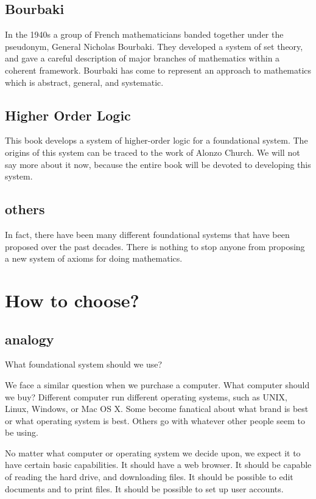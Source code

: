 \documentclass[cup9a]{cupbook}
\begin{document}
\subsection{Bourbaki}

In the 1940s a group of French mathematicians banded together under the pseudonym, General Nicholas Bourbaki.  They developed a system of set theory, and gave a careful description of major branches of mathematics within a coherent framework.  Bourbaki has come to represent an approach to mathematics which is abstract, general, and systematic.

\subsection{Higher Order Logic}

This book develops a system of higher-order logic for a foundational system.  The origins of this system can be traced to the work of Alonzo Church.  We will not say more about it now, because the entire book will be devoted to developing this system.

\subsection{others}


In fact, there have been many different foundational systems that have been proposed over the past decades.  There is nothing to stop anyone from proposing a new system of axioms for doing mathematics.


\section{How to choose?}

\subsection{analogy}

What foundational system should we use?

We face a similar question when we purchase a computer.  What computer should we buy?  Different computer run different operating systems, such as UNIX, Linux, Windows, or Mac OS X.  Some become fanatical about what brand is best or what operating system is best.  Others go with whatever other people seem to be using.

No matter what computer or operating system we decide upon, we expect it to have certain basic capabilities.  It should have a web browser.  It should be capable of reading the hard drive, and downloading files.  It should be possible to edit documents and to print files.  It should be possible to set up user accounts.
\end{document}
